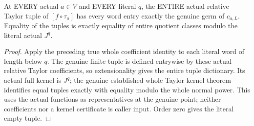 \begin{theorem}
\label{hir:relative-normal-translated-taylor-all-word-tuples}
\leanok
{}
At EVERY actual $a\in V$ and EVERY literal $q$, the ENTIRE actual relative
Taylor tuple of $[f\circ\tau_a]$ has every word entry exactly the genuine germ
of $c_{a,L}$. Equality of the tuples is exactly equality of entire quotient
classes modulo the literal actual $J^q$.
\end{theorem}
\begin{proof}
Apply the preceding true whole coefficient identity to each literal word of
length below $q$. The genuine finite tuple is defined entrywise by these
actual relative Taylor coefficients, so extensionality gives the entire
tuple dictionary. Its actual full kernel is $J^q$; the genuine established
whole Taylor-kernel theorem identifies equal tuples exactly with equality
modulo the whole normal power. This uses the actual functions as
representatives at the genuine point; neither coefficients nor a kernel
certificate is caller input. Order zero gives the literal empty tuple.
\end{proof}

